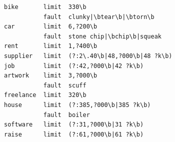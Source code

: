 \begin{verbatim}
bike       limit  330\b
           fault  clunky|\btear\b|\btorn\b
car        limit  6,?200\b
           fault  stone chip|\bchip\b|squeak
rent       limit  1,?400\b
supplier   limit  (?:2\.40\b|48,?000\b|48 ?k\b)
job        limit  (?:42,?000\b|42 ?k\b)
artwork    limit  3,?000\b
           fault  scuff
freelance  limit  320\b
house      limit  (?:385,?000\b|385 ?k\b)
           fault  boiler
software   limit  (?:31,?000\b|31 ?k\b)
raise      limit  (?:61,?000\b|61 ?k\b)
\end{verbatim}
